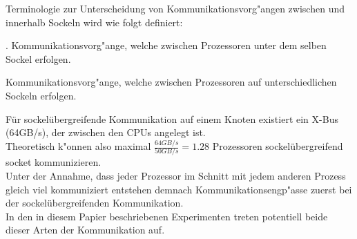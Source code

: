 Terminologie zur Unterscheidung von Kommunikationsvorg"angen zwischen und innerhalb Sockeln wird wie folgt definiert:\\
\begin{defi}.
Kommunikationsvorg"ange, welche zwischen Prozessoren unter dem selben Sockel erfolgen.
\end{defi}
\begin{defi}
Kommunikationsvorg"ange, welche zwischen Prozessoren auf unterschiedlichen Sockeln erfolgen.
\end{defi}
Für sockelübergreifende Kommunikation auf einem Knoten existiert ein X-Bus (64GB/s), der zwischen den CPUs angelegt ist.\\
Theoretisch k"onnen also maximal $\frac{64GB/s}{50GB/s} = 1.28$ Prozessoren sockelübergreifend socket kommunizieren.\\
Unter der Annahme, dass jeder Prozessor im Schnitt mit jedem anderen Prozess gleich viel kommuniziert  entstehen demnach Kommunikationsengp"asse zuerst bei der sockelübergreifenden Kommunikation.\\
In den in diesem Papier beschriebenen Experimenten treten potentiell beide dieser Arten der Kommunikation auf.


